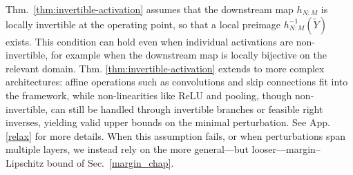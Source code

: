 \documentclass{article}
\theoremstyle{plain}
\theoremstyle{definition}
\theoremstyle{remark}
\begin{document}
Thm.~\ref{thm:invertible-activation} assumes that the downstream map $h_{N:M}$ is locally invertible at the operating point, so that a local preimage $h_{N:M}^{-1}(\tilde Y)$ exists.
This condition can hold even when individual activations are non-invertible, for example when the downstream map is locally bijective on the relevant domain.
Thm. \ref{thm:invertible-activation} extends to more complex architectures: affine operations such as convolutions and skip connections fit into the framework, while non-linearities like ReLU and pooling, though non-invertible, can still be handled through invertible branches or feasible right inverses, yielding valid upper bounds on the minimal perturbation. See App. \ref{relax} for more details.
When this assumption fails, or when perturbations span multiple layers, we instead rely on the more general—but looser—margin--Lipschitz bound of Sec.~\ref{margin_chap}.




\end{document}
